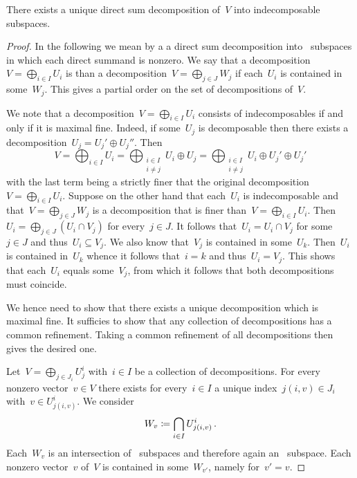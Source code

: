 \documentclass[a4paper,11pt]{scrartcl}
\begin{document}
\begin{proposition}
  There exists a unique direct sum decomposition of~$V$ into indecomposable~ subspaces.
\end{proposition}

\begin{proof}
  In the following we mean by a  a direct sum decomposition into~ subspaces in which each direct summand is nonzero.
  We say that a decomposition~$V = \bigoplus_{i \in I} U_i$ is  than a decomposition~$V = \bigoplus_{j \in J} W_j$ if each~$U_i$ is contained in some~$W_j$.
  This gives a partial order on the set of decompositions of~$V$.

  We note that a decomposition~$V = \bigoplus_{i \in I} U_i$ consists of indecomposables if and only if it is maximal fine.
  Indeed, if some~$U_j$ is decomposable then there exists a decomposition~$U_j = U_j' \oplus U_j''$.
  Then
  \[
    V
    =
    \bigoplus_{i \in I} U_i
    =
    \bigoplus_{\substack{i \in I \\ i \neq j}} U_i \oplus U_j
    =
    \bigoplus_{\substack{i \in I \\ i \neq j}} U_i \oplus U_j' \oplus U_j'
  \]
  with the last term being a strictly finer that the original decomposition~$V = \bigoplus_{i \in I} U_i$.
  Suppose on the other hand that each~$U_i$ is indecomposable and that~$V = \bigoplus_{j \in J} W_j$ is a decomposition that is finer than~$V = \bigoplus_{i \in I} U_i$.
  Then~$U_i = \bigoplus_{j \in J} (U_i \cap V_j)$ for every~$j \in J$.
  It follows that~$U_i = U_i \cap V_j$ for some~$j \in J$ and thus~$U_i \subseteq V_j$.
  We also know that~$V_j$ is contained in some~$U_k$.
  Then~$U_i$ is contained in~$U_k$ whence it follows that~$i = k$ and thus~$U_i = V_j$.
  This shows that each~$U_i$ equals some~$V_j$, from which it follows that both decompositions must coincide.

  We hence need to show that there exists a unique decomposition which is maximal fine.
  It sufficies to show that any collection of decompositions has a common refinement.
  Taking a common refinement of all decompositions then gives the desired one.

  Let~$V = \bigoplus_{j \in J_i} U^i_j$ with~$i \in I$ be a collection of decompositions.
  For every nonzero vector~$v \in V$ there exists for every~$i \in I$ a unique index~$j(i,v) \in J_i$ with~$v \in U^i_{j(i,v)}$.
  We consider
  \[
    W_v
    \coloneqq
    \bigcap_{i \in I} U^i_{j(i,v)} \,.
  \]
  Each~$W_v$ is an intersection of~ subspaces and therefore again an~ subspace.
  Each nonzero vector~$v$ of~$V$ is contained in some~$W_{v'}$, namely for~$v' = v$.


\end{proof}
\end{document}
